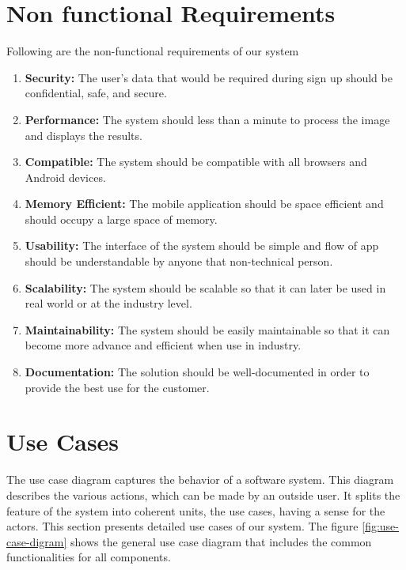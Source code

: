 \section{Non functional Requirements}
Following are the non-functional requirements of our system
\begin{enumerate}
  \item \textbf{Security:} The user's data that would be required during sign up should be confidential, safe, and secure.
  \item \textbf{Performance:} The system should less than a minute to process the image and displays the results.
  \item \textbf{Compatible:} The system should be compatible with all browsers and Android devices.
  \item \textbf{Memory Efficient:} The mobile application should be space efficient and should occupy a large space of memory.
  \item \textbf{Usability:} The interface of the system should be simple and flow of app should be understandable by anyone that non-technical person.
  \item \textbf{Scalability:} The system should be scalable so that it can later be used in real world or at the industry level.
  \item \textbf{Maintainability:} The system should be easily maintainable so that it can become more advance and efficient when use in industry.
  \item \textbf{Documentation:} The solution should be well-documented in order to provide the best use for the customer.
\end{enumerate}

\clearpage

\section{Use Cases}
The use case diagram captures the behavior of a software system. This diagram describes the various actions, which can be made by an outside user. It splits the feature of the system into coherent units, the use cases, having a sense for the actors. This section presents detailed use cases of our system. The figure \ref{fig:use-case-digram} shows the general use case diagram that includes the common functionalities for all components. \\

